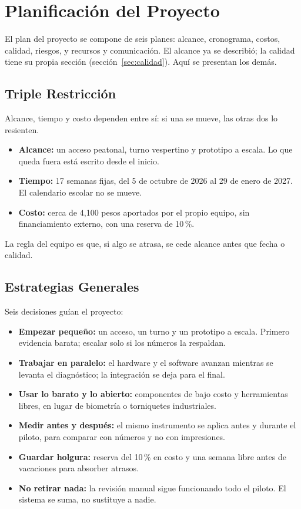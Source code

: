 \section{Planificación del Proyecto}
El plan del proyecto se compone de seis planes: alcance, cronograma, costos,
calidad, riesgos, y recursos y comunicación. El alcance ya se describió; la
calidad tiene su propia sección (sección~\ref{sec:calidad}). Aquí se
presentan los demás.

\subsection{Triple Restricción}
Alcance, tiempo y costo dependen entre sí: si una se mueve, las otras dos lo
resienten.
\begin{itemize}
	\item \textbf{Alcance:} un acceso peatonal, turno vespertino y prototipo a
	      escala. Lo que queda fuera está escrito desde el inicio.
	\item \textbf{Tiempo:} 17 semanas fijas, del 5 de octubre de 2026 al 29 de
	      enero de 2027. El calendario escolar no se mueve.
	\item \textbf{Costo:} cerca de 4,100 pesos aportados por el propio equipo,
	      sin financiamiento externo, con una reserva de 10\,\%.
\end{itemize}
La regla del equipo es que, si algo se atrasa, se cede alcance antes que fecha
o calidad.

\subsection{Estrategias Generales}
Seis decisiones guían el proyecto:
\begin{itemize}
	\item \textbf{Empezar pequeño:} un acceso, un turno y un prototipo a escala.
	      Primero evidencia barata; escalar solo si los números la respaldan.
	\item \textbf{Trabajar en paralelo:} el hardware y el software avanzan
	      mientras se levanta el diagnóstico; la integración se deja para el final.
	\item \textbf{Usar lo barato y lo abierto:} componentes de bajo costo y
	      herramientas libres, en lugar de biometría o torniquetes industriales.
	\item \textbf{Medir antes y después:} el mismo instrumento se aplica antes
	      y durante el piloto, para comparar con números y no con impresiones.
	\item \textbf{Guardar holgura:} reserva del 10\,\% en costo y una semana
	      libre antes de vacaciones para absorber atrasos.
	\item \textbf{No retirar nada:} la revisión manual sigue funcionando todo el
	      piloto. El sistema se suma, no sustituye a nadie.
\end{itemize}

